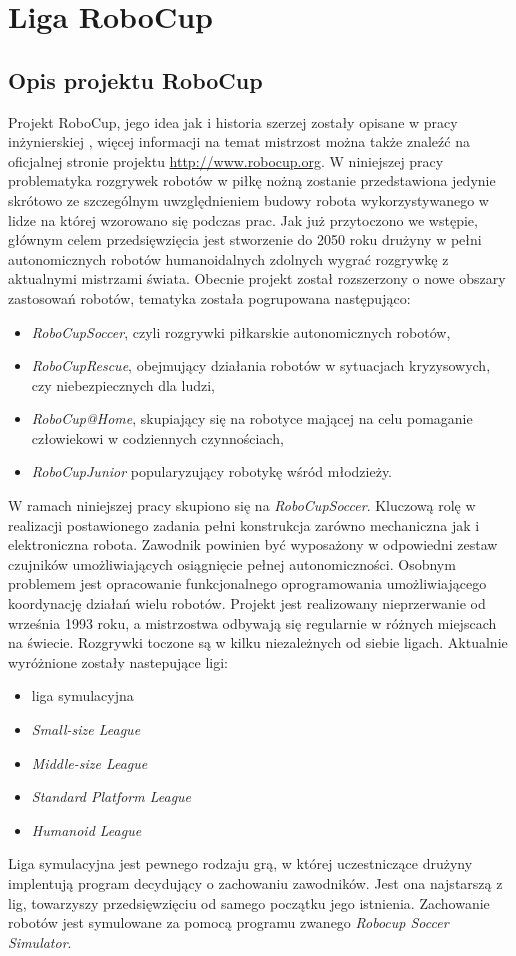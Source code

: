 \chapter{Liga RoboCup \label{chap:robocup}}
\section{Opis projektu RoboCup \label{sec:opis_robocup}}
	Projekt RoboCup, jego idea jak i historia szerzej zostały opisane w pracy inżynierskiej \cite{inzynierka}, więcej informacji na temat mistrzost można także znaleźć na oficjalnej stronie projektu
	\mbox{\url{http://www.robocup.org}}. W niniejszej pracy problematyka rozgrywek robotów w piłkę nożną zostanie przedstawiona jedynie skrótowo ze szczególnym uwzględnieniem
	budowy robota wykorzystywanego w lidze na której wzorowano się podczas prac.
	Jak już przytoczono we wstępie, głównym celem przedsięwzięcia jest stworzenie do 2050 roku drużyny w pełni autonomicznych robotów humanoidalnych zdolnych wygrać rozgrywkę z aktualnymi mistrzami 
	świata. Obecnie projekt został rozszerzony o nowe obszary zastosowań robotów, tematyka została pogrupowana następująco:
	\begin{itemize}
	      \item \emph{RoboCupSoccer}, czyli rozgrywki piłkarskie autonomicznych robotów,
	      \item \emph{RoboCupRescue}, obejmujący działania robotów w sytuacjach kryzysowych, czy niebezpiecznych dla ludzi,
	      \item \emph{RoboCup@Home}, skupiający się na robotyce mającej na celu pomaganie człowiekowi w codziennych czynnościach,
	      \item \emph{RoboCupJunior} popularyzujący robotykę wśród młodzieży.
	\end{itemize}
	W ramach niniejszej pracy skupiono się na \emph{RoboCupSoccer}.
	Kluczową rolę w realizacji postawionego zadania pełni konstrukcja zarówno mechaniczna jak i elektroniczna
	robota. Zawodnik powinien być wyposażony w odpowiedni zestaw czujników umożliwiających osiągnięcie pełnej autonomiczności. 
	Osobnym problemem jest opracowanie funkcjonalnego oprogramowania umożliwiającego koordynację działań wielu robotów.
	Projekt jest realizowany nieprzerwanie od września 1993 roku, a mistrzostwa odbywają się regularnie w różnych miejscach na świecie.
	Rozgrywki toczone są w kilku niezależnych od siebie ligach. Aktualnie wyróżnione zostały nastepujące ligi:
	\begin{itemize}
	\item liga symulacyjna
	\item \emph{Small-size League}
	\item \emph{Middle-size League}
	\item \emph{Standard Platform League }
	\item \emph{Humanoid League}
	\end{itemize}
	Liga symulacyjna jest pewnego rodzaju grą, w której uczestniczące drużyny implentują program decydujący o zachowaniu zawodników.
	Jest ona najstarszą z lig, towarzyszy przedsięwzięciu od samego początku jego istnienia.
	Zachowanie robotów jest symulowane za pomocą programu zwanego \emph{Robocup Soccer Simulator}.

